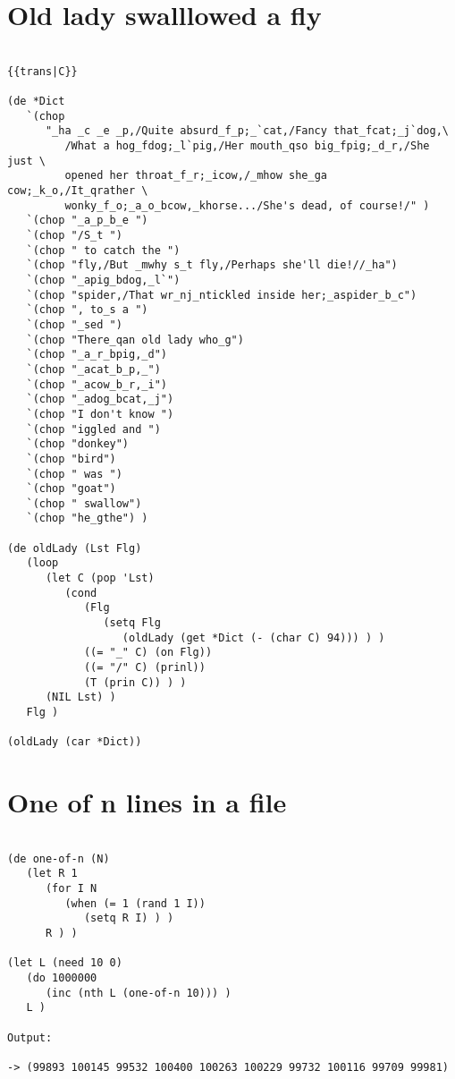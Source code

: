 \section*{Old lady swalllowed a fly}

\begin{verbatim}

{{trans|C}}

(de *Dict
   `(chop
      "_ha _c _e _p,/Quite absurd_f_p;_`cat,/Fancy that_fcat;_j`dog,\
         /What a hog_fdog;_l`pig,/Her mouth_qso big_fpig;_d_r,/She just \
         opened her throat_f_r;_icow,/_mhow she_ga cow;_k_o,/It_qrather \
         wonky_f_o;_a_o_bcow,_khorse.../She's dead, of course!/" )
   `(chop "_a_p_b_e ")
   `(chop "/S_t ")
   `(chop " to catch the ")
   `(chop "fly,/But _mwhy s_t fly,/Perhaps she'll die!//_ha")
   `(chop "_apig_bdog,_l`")
   `(chop "spider,/That wr_nj_ntickled inside her;_aspider_b_c")
   `(chop ", to_s a ")
   `(chop "_sed ")
   `(chop "There_qan old lady who_g")
   `(chop "_a_r_bpig,_d")
   `(chop "_acat_b_p,_")
   `(chop "_acow_b_r,_i")
   `(chop "_adog_bcat,_j")
   `(chop "I don't know ")
   `(chop "iggled and ")
   `(chop "donkey")
   `(chop "bird")
   `(chop " was ")
   `(chop "goat")
   `(chop " swallow")
   `(chop "he_gthe") )

(de oldLady (Lst Flg)
   (loop
      (let C (pop 'Lst)
         (cond
            (Flg
               (setq Flg
                  (oldLady (get *Dict (- (char C) 94))) ) )
            ((= "_" C) (on Flg))
            ((= "/" C) (prinl))
            (T (prin C)) ) )
      (NIL Lst) )
   Flg )

(oldLady (car *Dict))

\end{verbatim}

\section*{One of n lines in a file}

\begin{verbatim}

(de one-of-n (N)
   (let R 1
      (for I N
         (when (= 1 (rand 1 I))
            (setq R I) ) )
      R ) )

(let L (need 10 0)
   (do 1000000
      (inc (nth L (one-of-n 10))) )
   L )

Output:

-> (99893 100145 99532 100400 100263 100229 99732 100116 99709 99981)

\end{verbatim}

